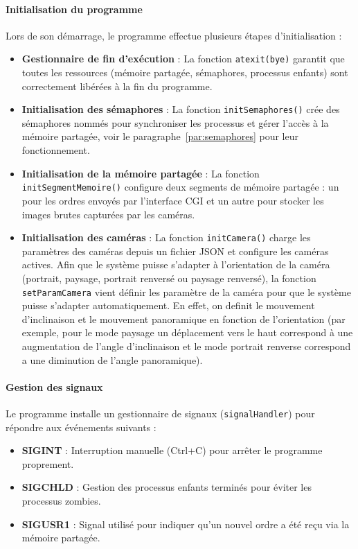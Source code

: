 \documentclass[a4paper, 11pt, french]{article}
\begin{document}
\paragraph{Initialisation du programme}
Lors de son démarrage, le programme effectue plusieurs étapes d'initialisation :
\begin{itemize}
    \item \textbf{Gestionnaire de fin d'exécution} : La fonction \texttt{atexit(bye)} garantit que toutes les ressources (mémoire partagée, sémaphores, processus enfants) sont correctement libérées à la fin du programme.
    \item \textbf{Initialisation des sémaphores} : La fonction \texttt{initSemaphores()} crée des sémaphores nommés pour synchroniser les processus et gérer l'accès à la mémoire partagée, voir le paragraphe~\ref{par:semaphores} pour leur fonctionnement.
    \item \textbf{Initialisation de la mémoire partagée} : La fonction \texttt{initSegmentMemoire()} configure deux segments de mémoire partagée : un pour les ordres envoyés par l'interface CGI et un autre pour stocker les images brutes capturées par les caméras.
    \item \textbf{Initialisation des caméras} : La fonction \texttt{initCamera()} charge les paramètres des caméras depuis un fichier JSON et configure les caméras actives. Afin que le système puisse s'adapter à l'orientation de la caméra (portrait, paysage, portrait renversé ou paysage renversé), la fonction \texttt{setParamCamera} vient définir les paramètre de la caméra pour que le système puisse s'adapter automatiquement. En effet, on definit le mouvement d'inclinaison et le mouvement panoramique en fonction de l'orientation (par exemple, pour le mode paysage un déplacement vers le haut correspond à une augmentation de l'angle d'inclinaison et le mode portrait renverse correspond a une diminution de l'angle panoramique).
\end{itemize}

\paragraph{Gestion des signaux}
Le programme installe un gestionnaire de signaux (\texttt{signalHandler}) pour répondre aux événements suivants :
\begin{itemize}
    \item \textbf{SIGINT} : Interruption manuelle (Ctrl+C) pour arrêter le programme proprement.
    \item \textbf{SIGCHLD} : Gestion des processus enfants terminés pour éviter les processus zombies.
    \item \textbf{SIGUSR1} : Signal utilisé pour indiquer qu'un nouvel ordre a été reçu via la mémoire partagée.
\end{itemize}
\end{document}
